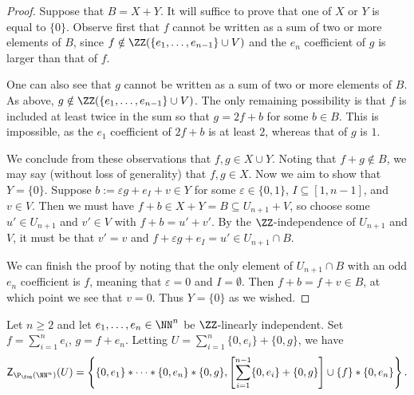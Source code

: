 \begin{proof}
	Suppose that $B = X + Y$.
	It will suffice to prove that one of $X$ or $Y$ is equal to $\{0\}$.
	Observe first that $f$ cannot be written as a sum of two or more elements of $B$, since $f\notin \ZZ (\{e_1,\dots, e_{n-1}\}\cup V)$ and the $e_n$ coefficient of $g$ is larger than that of $f$.
	
	One can also see that $g$ cannot be written as a sum of two or more elements of $B$.
	As above, $g\notin \ZZ (\{e_1,\dots, e_{n-1}\}\cup V)$.
	The only remaining possibility is that $f$ is included at least twice in the sum so that $g = 2f + b$ for some $b\in B$.
	This is impossible, as the $e_1$ coefficient of $2f+b$ is at least $2$, whereas that of $g$ is $1$.
	
	We conclude from these observations that $f,g\in X \cup Y$.
	Noting that $f+g \notin B$, we may say (without loss of generality) that $f,g\in X$.
	Now we aim to show that $Y = \{0\}$.
	Suppose $b := \varepsilon g + e_I +v \in Y$ for some $\varepsilon \in \{0,1\}$, $I\subseteq [ 1,n-1]$, and $v\in V$.
	Then we must have $f + b \in X+Y = B \subseteq U_{n+1} + V$, so choose some $u'\in U_{n+1}$ and $v'\in V$ with $f + b = u' + v'$.
	By the $\ZZ$-independence of $U_{n+1}$ and $V$, it must be that $v' = v$ and $f + \varepsilon g + e_I = u' \in U_{n+1} \cap B$.
	
	We can finish the proof by noting that the only element of $U_{n+1}\cap B$ with an odd $e_n$ coefficient is $f$, meaning that $\varepsilon=0$ and $I = \emptyset$.
	Then $f+b = f+v \in B$, at which point we see that $v = 0$.
	Thus $Y = \{0\}$ as we wished.
\end{proof}

\begin{thm} \label{thm:2n-length-set}
	Let $n\ge 2$ and let $e_1,\dots, e_n\in \NN^n$ be $\ZZ$-linearly independent.
	Set $f = \sum_{i=1}^n e_i$, $g=f+e_n$.
	Letting $U = \sum_{i=1}^n \{0,e_i\} + \{0,g\}$, we have 
	\[\mathsf{Z}_{\P_\fon(\NN^n)}(U) = \left\{ \{0,e_1\}*\cdots*\{0,e_n\}*\{0,g\}, \left[\sum_{i=1}^{n-1}\{0,e_i\}+\{0,g\}\right]\cup\{f\} * \{0,e_n\} \right\}. \]
\end{thm}

